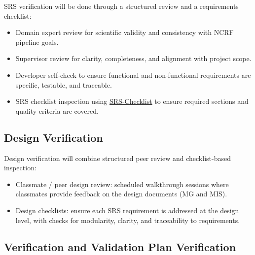 \documentclass[12pt, titlepage]{article}
\begin{document}
%
%
SRS verification will be done through a structured review and a requirements
checklist:
\begin{itemize}
  \item Domain expert review for scientific validity and consistency with NCRF pipeline goals.
  \item Supervisor review for clarity, completeness, and alignment with project scope.
  \item Developer self-check to ensure functional and non-functional requirements are specific, testable, and traceable.
  \item SRS checklist inspection using \href{../Checklists/SRS-Checklist.tex}{SRS-Checklist} to ensure required sections and quality criteria are covered.
\end{itemize}

\subsection{Design Verification}


%
Design verification will combine structured peer review and checklist-based inspection:
\begin{itemize}
  \item Classmate / peer design review: scheduled walkthrough sessions where classmates provide feedback on the design documents (MG and MIS).
  \item Design checklists: ensure each SRS requirement is addressed at the design level, with checks for modularity, clarity, and traceability to requirements.
\end{itemize}

\subsection{Verification and Validation Plan Verification}
\end{document}
